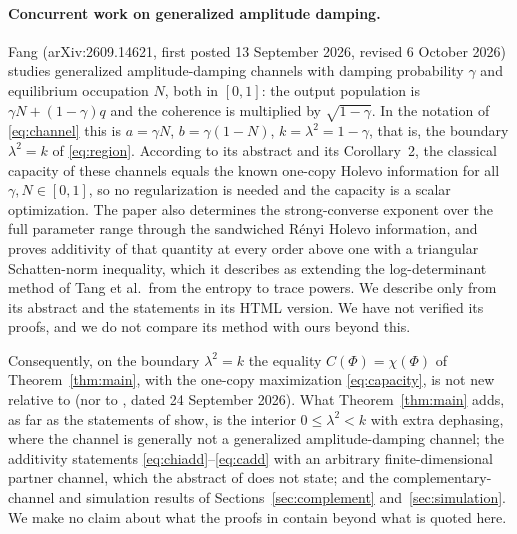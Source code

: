 \documentclass[11pt]{article}
\begin{document}
\paragraph{Concurrent work on generalized amplitude damping.}
Fang \cite{fang} (arXiv:2609.14621, first posted 13 September 2026, revised 6 October 2026) studies generalized amplitude-damping channels with damping probability $\gamma$ and equilibrium occupation $N$, both in $[0,1]$: the output population is $\gamma N+(1-\gamma)q$ and the coherence is multiplied by $\sqrt{1-\gamma}$. In the notation of \eqref{eq:channel} this is $a=\gamma N$, $b=\gamma(1-N)$, $k=\lambda^2=1-\gamma$, that is, the boundary $\lambda^2=k$ of \eqref{eq:region}. According to its abstract and its Corollary~2, the classical capacity of these channels equals the known one-copy Holevo information for all $\gamma,N\in[0,1]$, so no regularization is needed and the capacity is a scalar optimization. The paper also determines the strong-converse exponent over the full parameter range through the sandwiched R\'enyi Holevo information, and proves additivity of that quantity at every order above one with a triangular Schatten-norm inequality, which it describes as extending the log-determinant method of Tang et al.\ from the entropy to trace powers. We describe \cite{fang} only from its abstract and the statements in its HTML version. We have not verified its proofs, and we do not compare its method with ours beyond this.

Consequently, on the boundary $\lambda^2=k$ the equality $C(\Phi)=\chi(\Phi)$ of Theorem~\ref{thm:main}, with the one-copy maximization \eqref{eq:capacity}, is not new relative to \cite{fang} (nor to \cite{openai}, dated 24 September 2026). What Theorem~\ref{thm:main} adds, as far as the statements of \cite{fang} show, is the interior $0\le\lambda^2<k$ with extra dephasing, where the channel is generally not a generalized amplitude-damping channel; the additivity statements \eqref{eq:chiadd}--\eqref{eq:cadd} with an arbitrary finite-dimensional partner channel, which the abstract of \cite{fang} does not state; and the complementary-channel and simulation results of Sections~\ref{sec:complement} and~\ref{sec:simulation}. We make no claim about what the proofs in \cite{fang} contain beyond what is quoted here.
\end{document}
